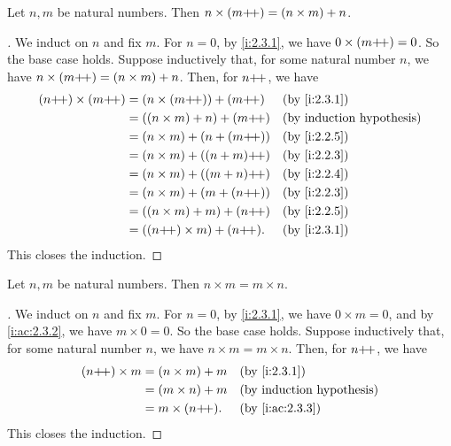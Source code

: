 \begin{ac}\label{i:ac:2.3.3}
  Let \(n, m\) be natural numbers.
  Then \(n \times (m{+}\!{+}) = (n \times m) + n\).
\end{ac}

\begin{proof}[]
  We induct on \(n\) and fix \(m\).
  For \(n = 0\), by \cref{i:2.3.1}, we have \(0 \times (m{+}\!{+}) = 0\).
  So the base case holds.
  Suppose inductively that, for some natural number \(n\), we have \(n \times (m{+}\!{+}) = (n \times m) + n\).
  Then, for \(n{+}\!{+}\), we have
  \begin{align*}
    (n\pp) \times (m\pp)
     & = (n \times (m\pp)) + (m\pp)  &  & \by{i:2.3.1} \\
     & = ((n \times m) + n) + (m\pp) &  & \byIH        \\
     & = (n \times m) + (n + (m\pp)) &  & \by{i:2.2.5} \\
     & = (n \times m) + ((n + m)\pp) &  & \by{i:2.2.3} \\
     & = (n \times m) + ((m + n)\pp) &  & \by{i:2.2.4} \\
     & = (n \times m) + (m + (n\pp)) &  & \by{i:2.2.3} \\
     & = ((n \times m) + m) + (n\pp) &  & \by{i:2.2.5} \\
     & = ((n\pp) \times m) + (n\pp). &  & \by{i:2.3.1}
  \end{align*}
  This closes the induction.
\end{proof}

\begin{lem}\label{i:2.3.2}
  Let \(n, m\) be natural numbers.
  Then \(n \times m = m \times n\).
\end{lem}

\begin{proof}[]
  We induct on \(n\) and fix \(m\).
  For \(n = 0\), by \cref{i:2.3.1}, we have \(0 \times m = 0\), and by \cref{i:ac:2.3.2}, we have \(m \times 0 = 0\).
  So the base case holds.
  Suppose inductively that, for some natural number \(n\), we have \(n \times m = m \times n\).
  Then, for \(n{+}\!{+}\), we have
  \begin{align*}
    (n\pp) \times m & = (n \times m) + m &  & \by{i:2.3.1}    \\
                    & = (m \times n) + m &  & \byIH           \\
                    & = m \times (n\pp). &  & \by{i:ac:2.3.3}
  \end{align*}
  This closes the induction.
\end{proof}

